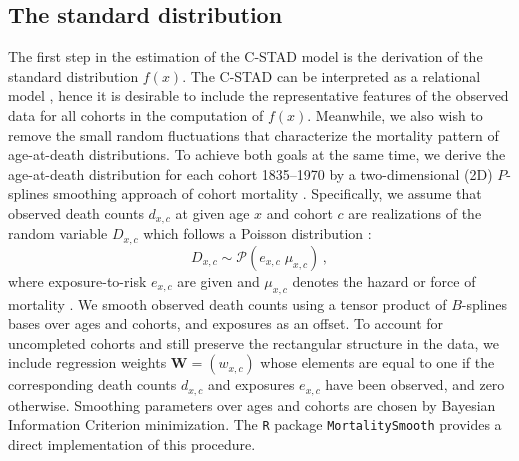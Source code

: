 \documentclass[11pt, a4paper]{article}
\begin{document}
\subsection{The standard distribution}
\label{Subsec:Standard}
The first step in the estimation of the C-STAD model is the derivation of the standard distribution $f(x)$. The C-STAD can be interpreted as a relational model \citep{brass1971scale}, hence it is desirable to include the representative features of the observed data for all cohorts in the computation of $f(x)$. Meanwhile, we also wish to remove the small random fluctuations that characterize the mortality pattern of age-at-death distributions. To achieve both goals at the same time, we derive the age-at-death distribution for each cohort 1835--1970 by a two-dimensional (2D) $P$-splines smoothing approach of cohort mortality \citep{eilers1996flexible, currie2004smoothing}. Specifically, we assume that observed death counts $d_{x,c}$ at given age $x$ and cohort $c$ are realizations of the random variable $D_{x,c}$ which follows a Poisson distribution \citep{brillinger1986biometrics}:
%
\begin{equation}\label{Eq:Poisson}
D_{x,c} \sim \mathcal{P}(e_{x,c} \; \mu_{x,c}) \, ,
\end{equation}
%
where exposure-to-risk $e_{x,c}$ are given and $\mu_{x,c}$ denotes the hazard or force of mortality \cite[such as in, for example,][]{brouhns2002poisson}. We smooth observed death counts using a tensor product of $B$-splines bases over ages and cohorts, and exposures as an offset. To account for uncompleted cohorts and still preserve the rectangular structure in the data, we include regression weights $\bm{W} = (w_{x,c})$ whose elements are equal to one if the corresponding death counts $d_{x,c}$ and exposures $e_{x,c}$ have been observed, and zero otherwise. Smoothing parameters over ages and cohorts are chosen by Bayesian Information Criterion minimization. The \texttt{R} package \texttt{MortalitySmooth} \citep{camarda2012mortalitysmooth} provides a direct implementation of this procedure. 
\end{document}
